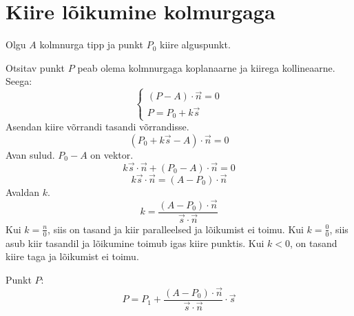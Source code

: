\documentclass[12pt,a4paper]{report}
\begin{document}
  \section{Kiire lõikumine kolmurgaga}
  Olgu \(A\) kolmnurga tipp ja punkt \(P_0\) kiire alguspunkt.
   
  Otsitav punkt \(P\) peab olema kolmnurgaga koplanaarne ja kiirega
  kollineaarne. Seega:
  \[\left\{\begin{array}{l}
      (P-A)\cdot\vec n = 0\\
      P=P_0+k\vec s
    \end{array}\right.\]
  Asendan kiire võrrandi tasandi võrrandisse.
  \[(P_0+k\vec s-A)\cdot\vec n = 0\]
  Avan sulud. \(P_0-A\) on vektor.
  \[k\vec s\cdot\vec n+(P_0-A)\cdot\vec n = 0\]
  \[k\vec s\cdot\vec n = (A-P_0)\cdot\vec n\]
  Avaldan \(k\).
  \[k=\frac{(A-P_0)\cdot\vec n}{\vec s\cdot\vec n}\]
  Kui \(k = \frac n0\), siis on tasand ja kiir paralleelsed ja lõikumist ei
  toimu. Kui \(k = \frac00\), siis asub kiir tasandil ja lõikumine toimub igas
  kiire punktis. Kui \(k < 0\), on tasand kiire taga ja lõikumist ei toimu.
  
  Punkt \(P\):
  \[P=P_1+\frac{(A-P_0)\cdot\vec n}{\vec s\cdot\vec n}\cdot\vec s\]
  
\end{document}
